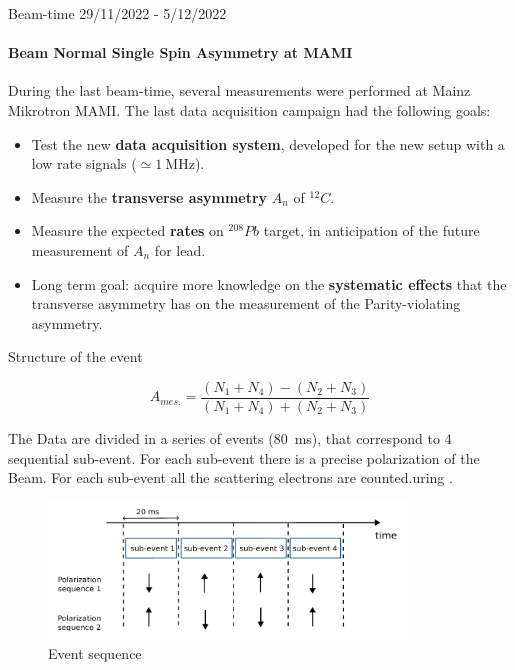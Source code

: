 \documentclass[9pt,a4paper]{beamer}
\begin{document}
\begin{frame}{Beam-time 29/11/2022 - 5/12/2022}
\framesubtitle{Beam Normal Single Spin Asymmetry at MAMI}
During the last beam-time, several measurements were performed at Mainz Mikrotron MAMI. The last data acquisition campaign had the following goals:

\begin{itemize}
\item Test the new \textbf{data acquisition system}, developed for the new setup with a low rate signals ($\simeq \SI{1}{\mega \hertz} $). 
\item Measure the \textbf{transverse asymmetry} $A_{n}$ of $^{12}C$.
\item Measure the expected \textbf{rates} on $^{208}Pb$ target, in anticipation of the future measurement of $A_{n}$ for lead. 
\item Long term goal: acquire more knowledge on the \textbf{systematic effects} that the transverse asymmetry has on the measurement of the Parity-violating asymmetry.
\end{itemize}
\end{frame}

\begin{frame}{Structure of the event}

\begin{equation}
A_{mes.} = \dfrac{(N_{1} + N_{4}) - (N_{2} + N_{3})}{(N_{1} + N_{4}) + (N_{2} + N_{3})}
\end{equation}

The Data are divided in a series of events (\SI{80}{\milli \second}), that correspond to 4 sequential sub-event. For each sub-event there is a precise polarization of the Beam. For each sub-event all the scattering electrons are counted.uring . 

\begin{figure}[hbtp]
\centering
\includegraphics[width = 0.85\textwidth]{figures/EventStructure.pdf}
\caption{Event sequence}
\end{figure}


\end{frame}
\end{document}
